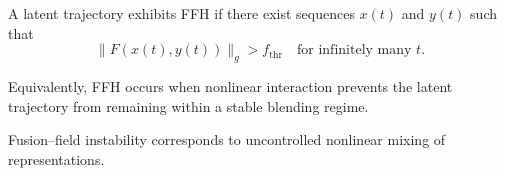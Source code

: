 A latent trajectory exhibits FFH if there exist sequences $x(t)$ and
$y(t)$ such that
\[
\|F(x(t), y(t))\|_g > f_{\mathrm{thr}}
\quad \text{for infinitely many } t.
\]

Equivalently, FFH occurs when nonlinear interaction prevents the latent
trajectory from remaining within a stable blending regime.

Fusion–field instability corresponds to uncontrolled nonlinear mixing of
representations.

